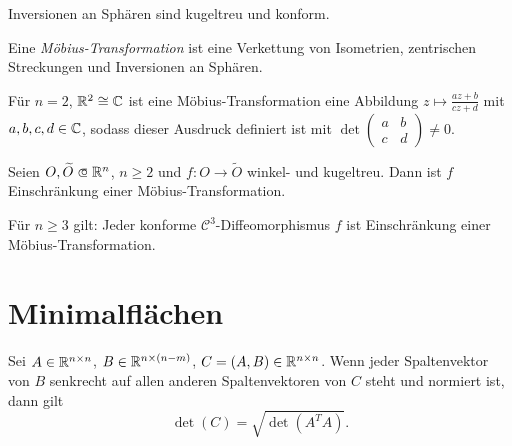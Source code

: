 \documentclass{cheat-sheet}
\newcommand{\Cont}{\mathcal{C}} %
\begin{document}
\begin{lem}
  Inversionen an Sphären sind kugeltreu und konform.
\end{lem}

\begin{defn}
  Eine \emph{Möbius-Transformation} ist eine Verkettung von Isometrien, zentrischen Streckungen und Inversionen an Sphären.
\end{defn}

\begin{bem}
  Für $n = 2$, $\mathbb{R}^2 \cong \mathbb{C}$ ist eine Möbius-Transformation eine Abbildung $z \mapsto \tfrac{az+b}{cz+d}$ mit $a, b, c, d \in \mathbb{C}$, sodass dieser Ausdruck definiert ist mit $\det \left( \begin{smallmatrix} a & b \\ c & d \end{smallmatrix} \right) \not= 0$.
\end{bem}

\begin{satz}
  Seien $O, \widetilde{O} \opn \R^n$, $n \geq 2$ und $f : O \to \widetilde{O}$ winkel- und kugeltreu. Dann ist $f$ Einschränkung einer Möbius-Transformation.
\end{satz}

\begin{kor}
  Für $n \geq 3$ gilt: Jeder konforme $\Cont^3$-Diffeomorphismus $f$ ist Einschränkung einer Möbius-Transformation.
\end{kor}


\section{Minimalflächen}


\begin{lem}
  Sei $A \in \mathbb{R}^{n \times n}$, $B \in \mathbb{R}^{n \times (n-m)}$, $C = (A, B) \in \mathbb{R}^{n \times n}$. Wenn jeder Spaltenvektor von $B$ senkrecht auf allen anderen Spaltenvektoren von $C$ steht und normiert ist, dann gilt
  \[ \det(C) = \sqrt{ \det(A^T A) }. \]
\end{lem}



\end{document}
